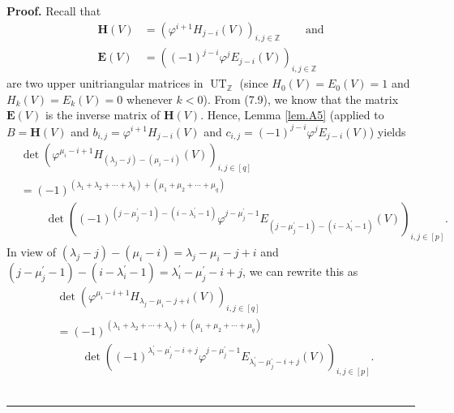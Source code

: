\documentclass[numbers=enddot,12pt,final,onecolumn,notitlepage]{scrartcl}%
\theoremstyle{definition}
\newenvironment{proof}[1][Proof]{\noindent\textbf{#1.} }{\ \rule{0.5em}{0.5em}}
\begin{document}
\begin{enumerate}
\begin{proof}
Recall that%
\begin{align*}
\mathbf{H}\left(  V\right)   &  =\left(  \varphi^{i+1}H_{j-i}\left(  V\right)
\right)  _{i,j\in\mathbb{Z}}\ \ \ \ \ \ \ \ \ \ \text{and}\\
\mathbf{E}\left(  V\right)   &  =\left(  \left(  -1\right)  ^{j-i}\varphi
^{j}E_{j-i}\left(  V\right)  \right)  _{i,j\in\mathbb{Z}}%
\end{align*}
are two upper unitriangular matrices in $\operatorname*{UT}%
\nolimits_{\mathbb{Z}}$ (since $H_{0}\left(  V\right)  =E_{0}\left(  V\right)
=1$ and $H_{k}\left(  V\right)  =E_{k}\left(  V\right)  =0$ whenever $k<0$).
From (7.9), we know that the matrix $\mathbf{E}\left(  V\right)  $ is the
inverse matrix of $\mathbf{H}\left(  V\right)  $. Hence, Lemma \ref{lem.A5}
(applied to $B=\mathbf{H}\left(  V\right)  $ and $b_{i,j}=\varphi^{i+1}%
H_{j-i}\left(  V\right)  $ and $c_{i,j}=\left(  -1\right)  ^{j-i}\varphi
^{j}E_{j-i}\left(  V\right)  $) yields%
\begin{align*}
&  \det\left(  \varphi^{\mu_{i}-i+1}H_{\left(  \lambda_{j}-j\right)  -\left(
\mu_{i}-i\right)  }\left(  V\right)  \right)  _{i,j\in\left[  q\right]  }\\
&  =\left(  -1\right)  ^{\left(  \lambda_{1}+\lambda_{2}+\cdots+\lambda
_{q}\right)  +\left(  \mu_{1}+\mu_{2}+\cdots+\mu_{q}\right)  }\\
&  \ \ \ \ \ \ \ \ \ \ \det\left(  \left(  -1\right)  ^{\left(  j-\mu
_{j}^{\prime}-1\right)  -\left(  i-\lambda_{i}^{\prime}-1\right)  }%
\varphi^{j-\mu_{j}^{\prime}-1}E_{\left(  j-\mu_{j}^{\prime}-1\right)  -\left(
i-\lambda_{i}^{\prime}-1\right)  }\left(  V\right)  \right)  _{i,j\in\left[
p\right]  }.
\end{align*}
In view of $\left(  \lambda_{j}-j\right)  -\left(  \mu_{i}-i\right)
=\lambda_{j}-\mu_{i}-j+i$ and $\left(  j-\mu_{j}^{\prime}-1\right)  -\left(
i-\lambda_{i}^{\prime}-1\right)  =\lambda_{i}^{\prime}-\mu_{j}^{\prime}-i+j$,
we can rewrite this as%
\begin{align*}
&  \det\left(  \varphi^{\mu_{i}-i+1}H_{\lambda_{j}-\mu_{i}-j+i}\left(
V\right)  \right)  _{i,j\in\left[  q\right]  }\\
&  =\left(  -1\right)  ^{\left(  \lambda_{1}+\lambda_{2}+\cdots+\lambda
_{q}\right)  +\left(  \mu_{1}+\mu_{2}+\cdots+\mu_{q}\right)  }\\
&  \ \ \ \ \ \ \ \ \ \ \det\left(  \left(  -1\right)  ^{\lambda_{i}^{\prime
}-\mu_{j}^{\prime}-i+j}\varphi^{j-\mu_{j}^{\prime}-1}E_{\lambda_{i}^{\prime
}-\mu_{j}^{\prime}-i+j}\left(  V\right)  \right)  _{i,j\in\left[  p\right]  }.

\end{align*}
\end{proof}
\end{enumerate}
\end{document}
